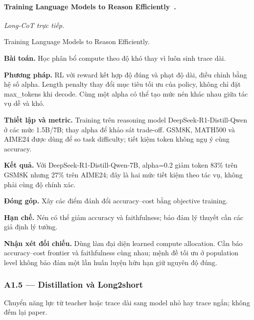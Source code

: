 \begin{samepage}
\paragraph{Training Language Models to Reason Efficiently~\cite{rra1_efficient_rl}.}
\emph{Long-CoT trực tiếp.}\par
{\raggedright\noindent\small Training Language Models to Reason Efficiently.\par}
\noindent\textbf{Bài toán.} Học phân bổ compute theo độ khó thay vì luôn sinh trace dài.\par
\end{samepage}
\noindent\textbf{Phương pháp.} RL với reward kết hợp độ đúng và phạt độ dài, điều chỉnh bằng hệ số alpha. Length penalty thay đổi mục tiêu tối ưu của policy, không chỉ đặt max\_tokens khi decode. Cùng một alpha có thể tạo mức nén khác nhau giữa tác vụ dễ và khó.\par
\noindent\textbf{Thiết lập và metric.} Training trên reasoning model DeepSeek-R1-Distill-Qwen ở các mức 1.5B/7B; thay alpha để khảo sát trade-off. GSM8K, MATH500 và AIME24 được dùng để so task difficulty; tiết kiệm token không ngụ ý cùng accuracy.\par
\noindent\textbf{Kết quả.} Với DeepSeek-R1-Distill-Qwen-7B, alpha=0.2 giảm token 83\% trên GSM8K nhưng 27\% trên AIME24; đây là hai mức tiết kiệm theo tác vụ, không phải cùng độ chính xác.\par
\noindent\textbf{Đóng góp.} Xây các điểm đánh đổi accuracy–cost bằng objective training.\par
\noindent\textbf{Hạn chế.} Nén có thể giảm accuracy và faithfulness; bảo đảm lý thuyết cần các giả định lý tưởng.\par
\begin{samepage}
\noindent\textbf{Nhận xét đối chiếu.} Dùng làm đại diện learned compute allocation. Cần báo accuracy–cost frontier và faithfulness cùng nhau; mệnh đề tối ưu ở population level không bảo đảm một lần huấn luyện hữu hạn giữ nguyên độ đúng.\par
{}
\end{samepage}

\subsubsection*{A1.5 — Distillation và Long2short}
Chuyển năng lực từ teacher hoặc trace dài sang model nhỏ hay trace ngắn; không đếm lại paper.

